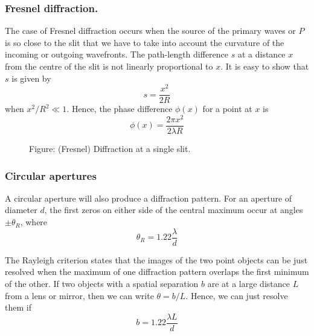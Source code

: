 \documentclass[../../../main.tex]{subfiles}
\begin{document}
\subsubsection*{Fresnel diffraction.} The case of Fresnel diffraction occurs when the source of the primary waves or $P$ is so close to the slit that we have to take into account the curvature of the incoming or outgoing wavefronts. The path-length difference $s$ at a distance $x$ from the centre of the slit is not linearly proportional to $x$. It is easy to show that $s$ is given by
\begin{equation*}
    s=\frac{x^2}{2R}
\end{equation*}
when $x^2/R^2 \ll 1$. Hence, the phase difference $\phi(x)$ for a point at $x$ is
\begin{equation*}
    \phi(x)=\frac{2\pi x^2}{2\lambda R}
\end{equation*}

\begin{figure*}
    \centering
    \caption*{Figure: (Fresnel) Diffraction at a single slit.}
\end{figure*}

\subsubsection*{Circular apertures}
A circular aperture will also produce a diffraction pattern. For an aperture of diameter $d$, the ﬁrst zeros on either side of the central maximum occur at angles $\pm \theta_R$, where
\begin{equation*}
    \theta_R=1.22\frac{\lambda}{d}
\end{equation*}

The Rayleigh criterion states that the images of the two point objects can be just resolved when the maximum of one diffraction pattern overlaps the ﬁrst minimum of the other. If two objects with a spatial separation $b$ are at a large distance $L$ from a lens or mirror, then we can write $\theta = b/L.$ Hence, we can just resolve them if
\begin{equation*}
    b=1.22\frac{\lambda L}{d}
\end{equation*}
\end{document}
